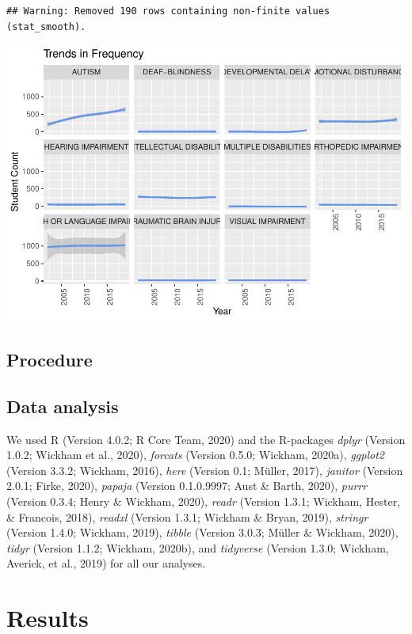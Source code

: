 \documentclass[
  english,
  man]{apa6}
\begin{document}
\begin{verbatim}
## Warning: Removed 190 rows containing non-finite values (stat_smooth).
\end{verbatim}

\includegraphics{draft_play_files/figure-latex/unnamed-chunk-2-1.pdf}

\hypertarget{procedure}{%
\subsection{Procedure}\label{procedure}}

\hypertarget{data-analysis}{%
\subsection{Data analysis}\label{data-analysis}}

We used R (Version 4.0.2; R Core Team, 2020) and the R-packages \emph{dplyr} (Version 1.0.2; Wickham et al., 2020), \emph{forcats} (Version 0.5.0; Wickham, 2020a), \emph{ggplot2} (Version 3.3.2; Wickham, 2016), \emph{here} (Version 0.1; Müller, 2017), \emph{janitor} (Version 2.0.1; Firke, 2020), \emph{papaja} (Version 0.1.0.9997; Aust \& Barth, 2020), \emph{purrr} (Version 0.3.4; Henry \& Wickham, 2020), \emph{readr} (Version 1.3.1; Wickham, Hester, \& Francois, 2018), \emph{readxl} (Version 1.3.1; Wickham \& Bryan, 2019), \emph{stringr} (Version 1.4.0; Wickham, 2019), \emph{tibble} (Version 3.0.3; Müller \& Wickham, 2020), \emph{tidyr} (Version 1.1.2; Wickham, 2020b), and \emph{tidyverse} (Version 1.3.0; Wickham, Averick, et al., 2019) for all our analyses.

\hypertarget{results-1}{%
\section{Results}\label{results-1}}
\end{document}
